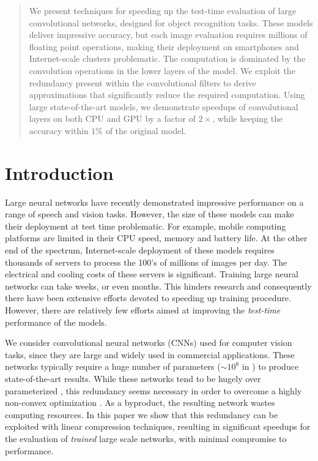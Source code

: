 \begin{abstract}
  We present techniques for speeding up the test-time evaluation of
  large convolutional networks, designed for object recognition
  tasks. These models deliver impressive accuracy, but each image
  evaluation requires millions of floating point operations, making
  their deployment on smartphones and Internet-scale clusters
  problematic. The computation is dominated by the convolution
  operations in the lower layers of the model. We exploit the redundancy
  present within the convolutional filters to derive
  approximations that significantly reduce the required
  computation. Using large state-of-the-art models, we demonstrate
  speedups of convolutional layers on both CPU and GPU by a factor of $2\times$, while keeping the accuracy
  within $1\%$ of the original model.
\end{abstract}

\section{Introduction}

Large neural networks have recently demonstrated impressive
performance on a range of speech and vision tasks. However, the size of
these models can make their deployment at test time problematic. For
example, mobile computing platforms are limited in their CPU speed,
memory and battery life. At the other end of the spectrum,
Internet-scale deployment of these models requires thousands of
servers to process the 100's of millions of images per day. The
electrical and cooling costs of these servers is significant.
Training large neural networks can take weeks, or even
months. This hinders research and consequently there have been
extensive efforts devoted to speeding up training procedure.  However,
there are relatively few efforts aimed at improving the {\em test-time}
performance of the models. 

 We consider convolutional neural networks (CNNs) used for computer vision tasks, since
they are large and widely used in commercial applications. 
These networks typically require a huge number of parameters ($\sim 10^{8}$ in \cite{sermanet2013overfeat})
to produce state-of-the-art results. 
While these networks tend to be hugely over parameterized \cite{denil2013predicting}, this redundancy seems necessary in order
to overcome a highly non-convex optimization \cite{hinton2012improving}. 
As a byproduct, the resulting network wastes computing resources.
In this paper we show that this redundancy can be 
exploited with linear compression techniques,
resulting in significant speedups for the evaluation of {\em trained}
large scale networks, with minimal compromise to performance.

